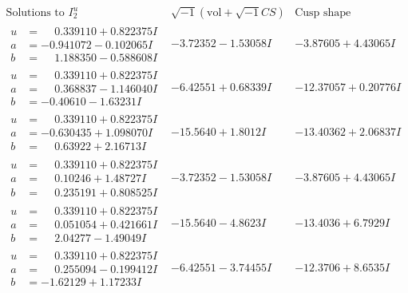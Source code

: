 \documentclass[1p]{elsarticle_modified}
\theoremstyle{definition}
\newcommand{\I}{\sqrt{-1}}
\begin{document}
$$\begin{array}{c|c|c}  
\text{Solutions to }I^u_{2}& \I (\text{vol} + \sqrt{-1}CS) & \text{Cusp shape}\\
 \hline 
\begin{aligned}
u &= \phantom{-}0.339110 + 0.822375 I \\
a &= -0.941072 - 0.102065 I \\
b &= \phantom{-}1.188350 - 0.588608 I\end{aligned}
 & -3.72352 - 1.53058 I & -3.87605 + 4.43065 I \\ \hline\begin{aligned}
u &= \phantom{-}0.339110 + 0.822375 I \\
a &= \phantom{-}0.368837 - 1.146040 I \\
b &= -0.40610 - 1.63231 I\end{aligned}
 & -6.42551 + 0.68339 I & -12.37057 + 0.20776 I \\ \hline\begin{aligned}
u &= \phantom{-}0.339110 + 0.822375 I \\
a &= -0.630435 + 1.098070 I \\
b &= \phantom{-}0.63922 + 2.16713 I\end{aligned}
 & -15.5640 + 1.8012 I & -13.40362 + 2.06837 I \\ \hline\begin{aligned}
u &= \phantom{-}0.339110 + 0.822375 I \\
a &= \phantom{-}0.10246 + 1.48727 I \\
b &= \phantom{-}0.235191 + 0.808525 I\end{aligned}
 & -3.72352 - 1.53058 I & -3.87605 + 4.43065 I \\ \hline\begin{aligned}
u &= \phantom{-}0.339110 + 0.822375 I \\
a &= \phantom{-}0.051054 + 0.421661 I \\
b &= \phantom{-}2.04277 - 1.49049 I\end{aligned}
 & -15.5640 - 4.8623 I & -13.4036 + 6.7929 I \\ \hline\begin{aligned}
u &= \phantom{-}0.339110 + 0.822375 I \\
a &= \phantom{-}0.255094 - 0.199412 I \\
b &= -1.62129 + 1.17233 I\end{aligned}
 & -6.42551 - 3.74455 I & -12.3706 + 8.6535 I \\ \hline\begin{aligned}

\end{aligned}
\end{array}$$
\end{document}
